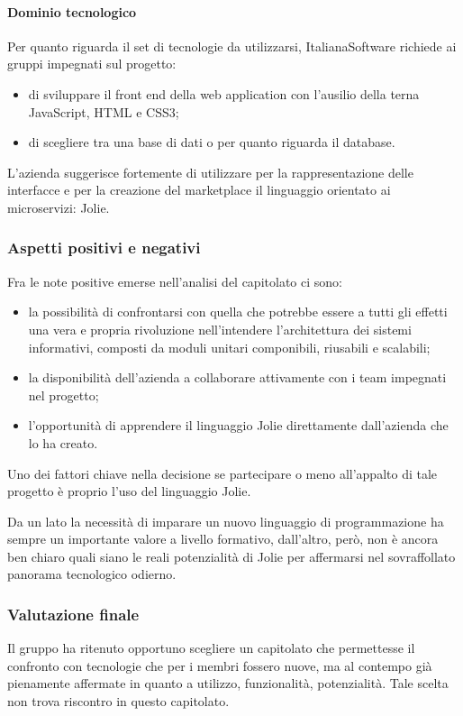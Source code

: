 			\paragraph{Dominio tecnologico}
			Per quanto riguarda il set di tecnologie da utilizzarsi, ItalianaSoftware richiede ai gruppi impegnati sul progetto:
			\begin{itemize}
			\item di sviluppare il front end della web application con l'ausilio della terna JavaScript, HTML e CSS3;
			\item di scegliere tra una base di dati  o  per quanto riguarda il database.
			\end{itemize}
			L'azienda suggerisce fortemente di utilizzare per la rappresentazione delle interfacce e per la creazione del marketplace
			il linguaggio orientato ai microservizi: Jolie.
		\subsubsection{Aspetti positivi e negativi}
		Fra le note positive emerse nell'analisi del capitolato ci sono:
		\begin{itemize}
			\item la possibilità di confrontarsi con quella che potrebbe essere a tutti gli effetti una vera e propria rivoluzione nell'intendere 
			l'architettura dei sistemi informativi, composti da moduli unitari componibili, riusabili e scalabili;
			\item la disponibilità dell'azienda a collaborare attivamente con i team impegnati nel progetto;
			\item l'opportunità di apprendere il linguaggio Jolie direttamente dall'azienda che lo ha creato.
		\end{itemize}
		Uno dei fattori chiave nella decisione se partecipare o meno all'appalto di tale progetto è proprio l'uso del linguaggio Jolie.

		Da un lato la necessità di imparare un nuovo linguaggio di programmazione ha sempre un importante valore a livello formativo, dall'altro, però, non è ancora ben chiaro quali siano le reali potenzialità di Jolie per affermarsi nel sovraffollato panorama tecnologico odierno.
		\subsubsection{Valutazione finale}
		Il gruppo \hx{} ha ritenuto opportuno scegliere un capitolato che permettesse il confronto con tecnologie che per i membri fossero nuove, ma al contempo già pienamente affermate in quanto a utilizzo, funzionalità, potenzialità. Tale scelta non trova riscontro in questo capitolato.
		
